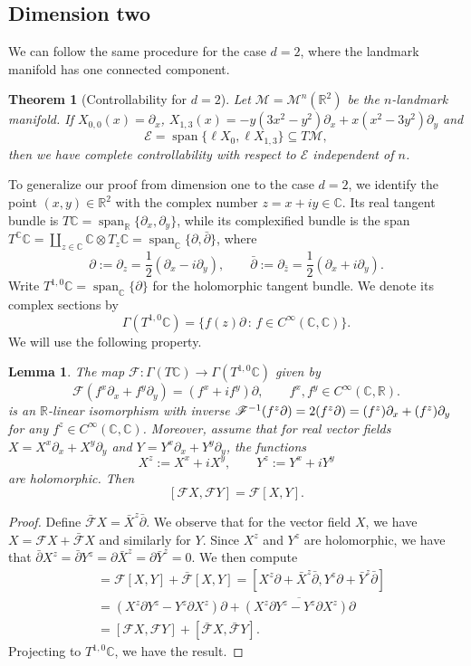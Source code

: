 \documentclass[10pt]{amsart}
\newcounter{dummy} \numberwithin{dummy}{section}
\newtheorem{theorem}[dummy]{Theorem}
\newtheorem{lemma}[dummy]{Lemma}
\theoremstyle{remark}
\newcommand{\R}{\mathbb{R}}
\newcommand{\C}{\mathbb{C}}
\let\Re\relax
\DeclareMathOperator{\Re}{Re}
\let\Im\relax
\DeclareMathOperator{\Im}{Im}
\DeclareMathOperator{\spn}{span}
\newcommand{\scrF}{\mathscr{F}}
\newcommand{\E}{\mathcal{E}}
\newcommand{\LM}{\mathcal{M}}
\numberwithin{equation}{section}
\begin{document}
\subsection{Dimension two}
We can follow the same procedure for the case $d=2$, where the landmark manifold has one connected component.

\begin{theorem}[Controllability for $d =2$] \label{th:main2}
Let $\LM = \LM^n(\mathbb{R}^2)$ be the $n$-landmark manifold. If $X_{0,0}(x) = \partial_x$, $X_{1,3}(x) =  -y(3x^2 - y^2) \partial_x + x(x^2 - 3y^2) \partial_y$ and
$$\E = \spn \{ \ell X_0, \ell X_{1,3}\}\subseteq T\LM,$$
then we have complete controllability with respect to $\E$ independent of $n$.
\end{theorem}
To generalize our proof from dimension one to the case $d=2$, we identify the point $(x,y)\in \mathbb{R}^2$ with the complex number $z= x +iy \in \mathbb{C}$. Its real tangent bundle is $T\C = \spn_{\R} \{ \partial_x, \partial_y\}$, while its complexified bundle is the span $T^{\C} \C = \coprod_{z\in \C} \C \otimes T_z \C = \spn_{\C} \{ \partial, \bar{\partial}\}$,
where
$$\partial := \partial_z = \frac{1}{2} \left(\partial_x - i \partial_y \right), \qquad \bar{\partial} := \partial_{\bar z} = \frac{1}{2} \left(\partial_x + i \partial_y \right). $$
Write $T^{1,0} \C = \spn_{\C} \{ \partial \}$ for the holomorphic tangent bundle. We denote its complex sections by
$$\Gamma(T^{1,0} \C) = \{ f(z) \partial \, : \, f \in C^\infty(\C, \C)\}.$$
We will use the following property.
\begin{lemma}
The map $\scrF: \Gamma(T\C) \to \Gamma(T^{1,0}\C)$ given by
$$\scrF(f^x \partial_x + f^y \partial_y) =(f^x + i f^y) \partial, \qquad f^x, f^y \in C^\infty(\C, \R).$$
is an $\R$-linear isomorphism with inverse $\scrF^{-1}(f^z \partial) = 2\Re(f^z\partial) = (\Re f^z) \partial_x + (\Im f^z) \partial_y$ for any $f^z \in C^\infty(\C,\C)$. Moreover, assume that for real vector fields $X = X^x \partial_x + X^y \partial_y$ and $Y = Y^x \partial_x + Y^y \partial_y$, the functions
$$X^z := X^x + i X^y, \qquad Y^z := Y^x + i Y^y$$
are holomorphic. Then
$$[\scrF X, \scrF Y] = \scrF [X,Y].$$
\end{lemma}
\begin{proof}


Define $\bar{\scrF} X = \bar{X}^z \bar{\partial}$. We observe that for the vector field $X$, we have $X =\scrF X + \bar{\scrF} X$ and similarly for $Y$. Since $X^z$ and $Y^z$ are holomorphic, we have that $\bar{\partial} X^z = \bar{\partial} Y^z  = \partial \bar{X}^z = \partial \bar{Y}^z=0$. We then compute
\begin{align}
[X, Y] & = \scrF [X, Y] + \bar{\scrF}[X, Y]  = [X^z \partial + \bar{X}^z \bar{\partial}, Y^z \partial + \bar{Y}^z \bar{\partial} ] \\
& = (X^z \partial Y^z - Y^z \partial X^z ) \partial + \overline{(X^z \partial Y^z - Y^z \partial X^z ) \partial} \\
& = [\scrF X, \scrF Y] + [\bar{\scrF}X, \bar{\scrF} Y].
\end{align}
Projecting to $T^{1,0}\C$, we have the result.
\end{proof}
\end{document}
